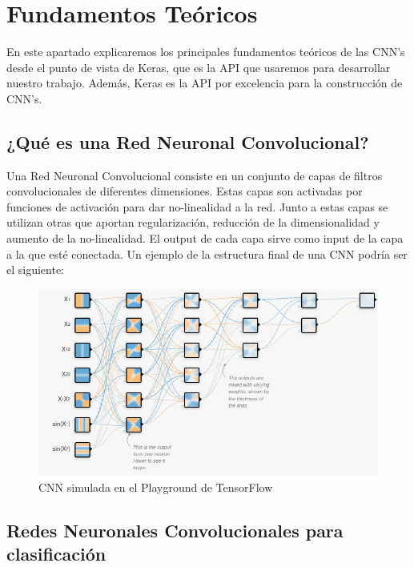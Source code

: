 \newpage
\section{Fundamentos Teóricos}

\vspace{5 mm}

En este apartado explicaremos los principales fundamentos teóricos de las CNN's desde el punto de vista de Keras, que es la API que usaremos para desarrollar nuestro trabajo. Además, Keras es la API por excelencia para la construcción de CNN's.

\vspace{1 cm}

\subsection{¿Qué es una Red Neuronal Convolucional?}

\vspace{5 mm}

Una Red Neuronal Convolucional consiste en un conjunto de capas de filtros convolucionales de diferentes dimensiones. Estas capas son activadas por funciones de activación para dar no-linealidad a la red. Junto a estas capas se utilizan otras que aportan regularización, reducción de la dimensionalidad y aumento de la no-linealidad. El output de cada capa sirve como input de la capa a la que esté conectada. Un ejemplo de la estructura final de una CNN podría ser el siguiente:

\vspace{5 mm}

\begin{figure}[H]
  \centering
  \includegraphics[width=0.5\linewidth]{Imagenes/cnn.png}  
  \caption{CNN simulada en el Playground de TensorFlow}
  \label{fig:sub-first}
\end{figure}

\vspace{1 cm}

\subsection{Redes Neuronales Convolucionales para clasificación}

